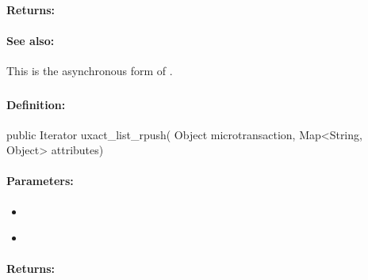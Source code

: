 \paragraph{Returns:}


\paragraph{See also:}  This is the asynchronous form of .

\pagebreak
\subsubsection{}
\label{api:java:uxact_list_rpush}


\paragraph{Definition:}
\begin{javacode}
public Iterator uxact_list_rpush(
        Object microtransaction,
        Map<String, Object> attributes)
\end{javacode}

\paragraph{Parameters:}
\begin{itemize}[noitemsep]
\item {}\\

\item {}\\

\end{itemize}

\paragraph{Returns:}


\pagebreak
\subsubsection{}
\label{api:java:cond_list_rpush}


